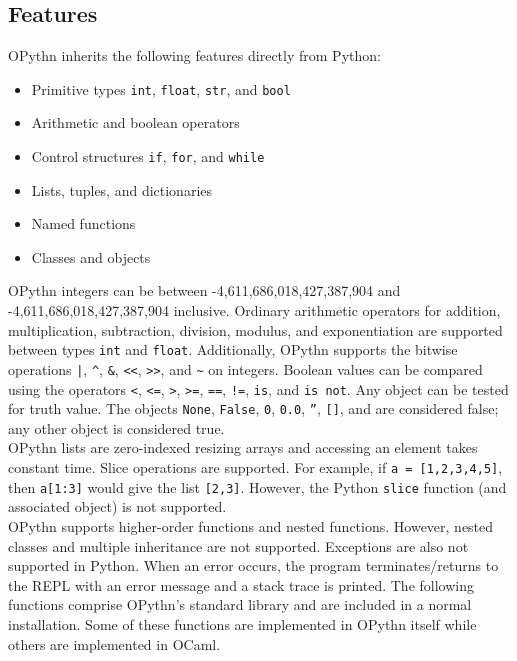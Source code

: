 \documentclass[11pt, twoside]{article}
\newcommand{\ms}{\texttt}
\begin{document}
    \subsection{Features}
    OPythn inherits the following features directly from Python:
    \begin{itemize}
        \item Primitive types \ms{int}, \ms{float}, \ms{str}, and \ms{bool}
        \item Arithmetic and boolean operators
        \item Control structures \ms{if}, \ms{for}, and \ms{while}
        \item Lists, tuples, and dictionaries
        \item Named functions
        \item Classes and objects
    \end{itemize}
    OPythn integers can be between -4,611,686,018,427,387,904 and -4,611,686,018,427,387,904 inclusive. Ordinary arithmetic operators for addition, multiplication, subtraction, division, modulus, and exponentiation are supported between types \ms{int} and \ms{float}. Additionally, OPythn supports the bitwise operations \ms{|}, \ms{\^}, \ms{\&}, \ms{<<}, \ms{>>}, and \ms{\~} on integers. Boolean values can be compared using the operators \ms{<}, \ms{<=}, \ms{>}, \ms{>=}, \ms{==}, \ms{!=}, \ms{is}, and \ms{is not}. Any object can be tested for truth value. The objects \ms{None}, \ms{False}, \ms{0}, \ms{0.0}, \ms{''}, \ms{[]}, and \ms{\string{\string}} are considered false; any other object is considered true.\\
    \indent OPythn lists are zero-indexed resizing arrays and accessing an element takes constant time. Slice operations are supported. For example, if \ms{a = [1,2,3,4,5]}, then \ms{a[1:3]} would give the list \ms{[2,3]}. However, the Python \ms{slice} function (and associated object) is not supported. \\
    \indent OPythn supports higher-order functions and nested functions. However, nested classes and multiple inheritance are not supported. Exceptions are also not supported in Python. When an error occurs, the program terminates/returns to the REPL with an error message and a stack trace is printed. 
    \indent The following functions comprise OPythn's standard library and are included in a normal installation. Some of these functions are implemented in OPythn itself while others are implemented in OCaml.
\end{document}
